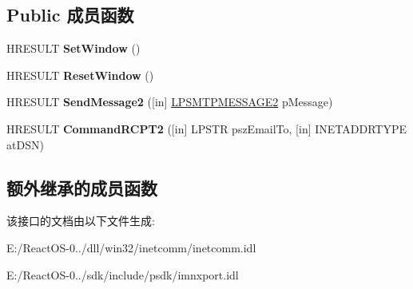 \subsection*{Public 成员函数}
\begin{DoxyCompactItemize}
\item 
\mbox{\label{class_i_s_m_t_p_transport2_a6db24b20f03a224980f58ac098ac0856}} 
H\+R\+E\+S\+U\+LT {\bfseries Set\+Window} ()
\item 
\mbox{\label{class_i_s_m_t_p_transport2_a3fcd86446f734727889e1111c1a6df9e}} 
H\+R\+E\+S\+U\+LT {\bfseries Reset\+Window} ()
\item 
\mbox{\label{class_i_s_m_t_p_transport2_a7932c65e45973b3a1a691b3e041769c0}} 
H\+R\+E\+S\+U\+LT {\bfseries Send\+Message2} (\mbox{[}in\mbox{]} \hyperlink{struct_i_s_m_t_p_transport2_1_1tag_s_m_t_p_m_e_s_s_a_g_e2}{L\+P\+S\+M\+T\+P\+M\+E\+S\+S\+A\+G\+E2} p\+Message)
\item 
\mbox{\label{class_i_s_m_t_p_transport2_af00d16ba228033cb541916ed98485781}} 
H\+R\+E\+S\+U\+LT {\bfseries Command\+R\+C\+P\+T2} (\mbox{[}in\mbox{]} L\+P\+S\+TR psz\+Email\+To, \mbox{[}in\mbox{]} I\+N\+E\+T\+A\+D\+D\+R\+T\+Y\+PE at\+D\+SN)
\end{DoxyCompactItemize}
\subsection*{额外继承的成员函数}


该接口的文档由以下文件生成\+:\begin{DoxyCompactItemize}
\item 
E\+:/\+React\+O\+S-\/0../dll/win32/inetcomm/inetcomm.\+idl\item 
E\+:/\+React\+O\+S-\/0../sdk/include/psdk/imnxport.\+idl\end{DoxyCompactItemize}
